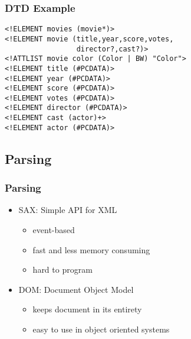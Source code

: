 \documentclass[dvipsnames]{beamer}
\theoremstyle{plain}
\begin{document}
\begin{frame}[fragile]
  \frametitle{DTD Example}

  \begin{example}
    \begin{lstlisting}
<!ELEMENT movies (movie*)>
<!ELEMENT movie (title,year,score,votes,
                 director?,cast?)>
<!ATTLIST movie color (Color | BW) "Color">
<!ELEMENT title (#PCDATA)>
<!ELEMENT year (#PCDATA)>
<!ELEMENT score (#PCDATA)>
<!ELEMENT votes (#PCDATA)>
<!ELEMENT director (#PCDATA)>
<!ELEMENT cast (actor)+>
<!ELEMENT actor (#PCDATA)>
    \end{lstlisting}
  \end{example}
\end{frame}

\subsection{Parsing}

\begin{frame}
  \frametitle{Parsing}

  \begin{itemize}
    \item \alert{SAX}: Simple API for XML
    \begin{itemize}
      \item event-based
      \item fast and less memory consuming
      \item hard to program
    \end{itemize}

    \pause
    \medskip
    \item \alert{DOM}: Document Object Model
    \begin{itemize}
      \item keeps document in its entirety
      \item easy to use in object oriented systems
    \end{itemize}
  \end{itemize}
\end{frame}
\end{document}
